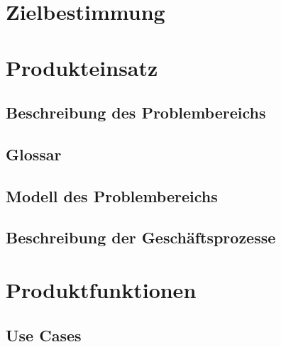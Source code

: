 \documentclass[11pt, a4paper]{article}
\begin{document}
	\section{Zielbestimmung}
	
	
	\section{Produkteinsatz}
	
	
		\subsection{Beschreibung des Problembereichs}
		
		
		\subsection{Glossar}
		
		
		\subsection{Modell des Problembereichs}
		
		
		\subsection{Beschreibung der Geschäftsprozesse}
		
		
			
	\section{Produktfunktionen}
	
	
		\subsection{Use Cases}
		
		
		
\end{document}
